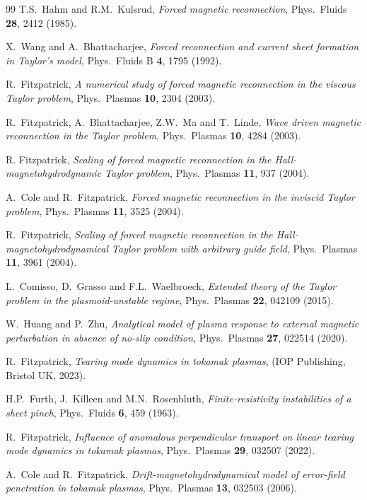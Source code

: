 \documentclass[12pt,prb,aps]{revtex4-1}
\begin{document}
\begin{thebibliography}{99}
 T.S.~Hahm and R.M.~Kulsrud, {\em Forced magnetic reconnection}, Phys.\ Fluids {\bf 28}, 2412 (1985).

 X.~Wang and A.~Bhattacharjee, {\em Forced reconnection and current sheet formation in Taylor’s model}, Phys.\ Fluids B {\bf 4}, 1795 (1992).

 R.~Fitzpatrick, {\em A numerical study of forced magnetic reconnection in the viscous Taylor problem}, Phys.\ Plasmas {\bf 10}, 2304 (2003).

 R.~Fitzpatrick, A.~Bhattacharjee, Z.W.~Ma and T.~Linde,  {\em Wave driven magnetic reconnection in the Taylor problem}, Phys.\ Plasmas {\bf 10}, 4284 (2003).

 R. Fitzpatrick,  {\em Scaling of forced magnetic reconnection in the Hall-magnetohydrodynamic Taylor problem}, Phys.\ Plasmas {\bf 11}, 937 (2004).

 A.~Cole and R.~Fitzpatrick, {\em Forced magnetic reconnection in the inviscid Taylor problem}, Phys.\ Plasmas {\bf 11}, 3525 (2004).

 R.~Fitzpatrick,  {\em Scaling of forced magnetic reconnection in the Hall-magnetohydrodynamical Taylor problem with arbitrary guide field}, Phys.\ Plasmas {\bf 11}, 3961 (2004).

 L.~Comisso, D.~Grasso and F.L.~Waelbroeck,  {\em Extended theory of the Taylor problem in the plasmoid-unstable regime}, Phys.\ Plasmas {\bf 22}, 042109 (2015).

 W.~Huang and P.~Zhu, {\em Analytical model of plasma response to external magnetic perturbation in absence of no-slip condition}, Phys.\  Plasmas {\bf 27}, 022514 (2020).

 R.~Fitzpatrick, {\em Tearing mode dynamics in tokamak plasmas}, (IOP Publishing, Bristol UK, 2023). 

 H.P.~Furth,  J.~Killeen and M.N.~Rosenbluth,  {\em Finite‐resistivity instabilities of a sheet pinch}, Phys.\ Fluids {\bf 6}, 459 (1963).

 R.~Fitzpatrick, {\em Influence of anomalous perpendicular transport on linear tearing mode dynamics in tokamak plasmas}, Phys.\ Plasmas {\bf 29}, 032507 (2022).

 A.~Cole and R.~Fitzpatrick, {\em Drift-magnetohydrodynamical model of error-field penetration in tokamak plasmas}, Phys.\ Plasmas {\bf 13}, 032503 (2006).


\end{thebibliography}
\end{document}
